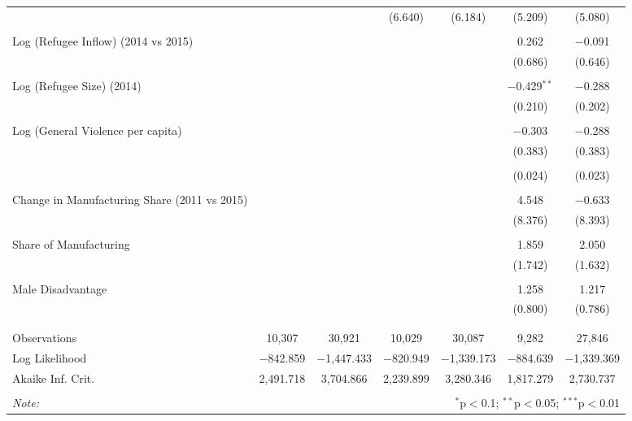 \begin{table}[!htbp]
\begin{tabular}{@{\extracolsep{5pt}}lcccccc}
  &  &  & (6.640) & (6.184) & (5.209) & (5.080) \\ 
  & & & & & & \\ 
 Log (Refugee Inflow) (2014 vs 2015) &  &  &  &  & 0.262 & $-$0.091 \\ 
  &  &  &  &  & (0.686) & (0.646) \\ 
  & & & & & & \\ 
 Log (Refugee Size) (2014) &  &  &  &  & $-$0.429$^{**}$ & $-$0.288 \\ 
  &  &  &  &  & (0.210) & (0.202) \\ 
  & & & & & & \\ 
 Log (General Violence per capita) &  &  &  &  & $-$0.303 & $-$0.288 \\ 
  &  &  &  &  & (0.383) & (0.383) \\ 
  & & & & & & \\ 
  &  &  &  &  & (0.024) & (0.023) \\ 
  & & & & & & \\ 
 Change in Manufacturing Share (2011 vs 2015) &  &  &  &  & 4.548 & $-$0.633 \\ 
  &  &  &  &  & (8.376) & (8.393) \\ 
  & & & & & & \\ 
 Share of Manufacturing &  &  &  &  & 1.859 & 2.050 \\ 
  &  &  &  &  & (1.742) & (1.632) \\ 
  & & & & & & \\ 
 Male Disadvantage &  &  &  &  & 1.258 & 1.217 \\ 
  &  &  &  &  & (0.800) & (0.786) \\ 
  & & & & & & \\ 
\hline \\[-1.8ex] 
Observations & 10,307 & 30,921 & 10,029 & 30,087 & 9,282 & 27,846 \\ 
Log Likelihood & $-$842.859 & $-$1,447.433 & $-$820.949 & $-$1,339.173 & $-$884.639 & $-$1,339.369 \\ 
Akaike Inf. Crit. & 2,491.718 & 3,704.866 & 2,239.899 & 3,280.346 & 1,817.279 & 2,730.737 \\ 
\hline 
\hline \\[-1.8ex] 
\textit{Note:}  & \multicolumn{6}{r}{$^{*}$p$<$0.1; $^{**}$p$<$0.05; $^{***}$p$<$0.01} \\ 
\end{tabular} 
\end{table} 
